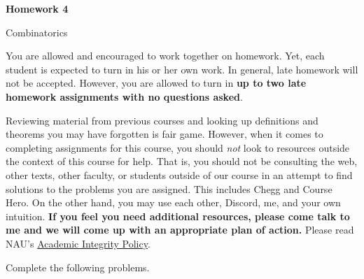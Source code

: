 \documentclass[11pt]{article}%
\theoremstyle{definition}
\newcommand{\blankline}{\pagebreak[2]\vspace{.5\baselineskip}}
\begin{document}
\begin{center}
{\Large\bf Homework 4}

\smallskip

Combinatorics
\end{center}

\thispagestyle{fancy}

You are allowed and encouraged to work together on homework. Yet, each student is expected to turn in his or her own work. In general, late homework will not be accepted. However, you are allowed to turn in \textbf{up to two late homework assignments with no questions asked}. 

\blankline

Reviewing material from previous courses and looking up definitions and theorems you may have forgotten is fair game. However, when it comes to completing assignments for this course, you should \emph{not} look to resources outside the context of this course for help.  That is, you should not be consulting the web, other texts, other faculty, or students outside of our course in an attempt to find solutions to the problems you are assigned.  This includes Chegg and Course Hero. On the other hand, you may use each other, Discord, me, and your own intuition. \textbf{If you feel you need additional resources, please come talk to me and we will come up with an appropriate plan of action.} Please read NAU's \href{https://www5.nau.edu/policies/Client/Details/828?whoIsLooking=Students&pertainsTo=All&sortDirection=Ascending&page=1}{Academic Integrity Policy}.

\blankline

Complete the following problems. 
\end{document}
